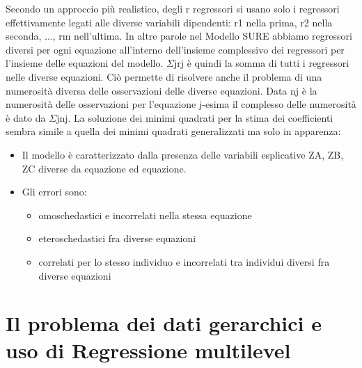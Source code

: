 \documentclass[a4page, 11pt]{article} %
\begin{document}
Secondo un approccio più realistico, degli r regressori si usano solo i regressori effettivamente legati alle diverse variabili dipendenti: r1 nella prima, r2 nella seconda, ..., rm nell’ultima.
\newline
In altre parole nel Modello SURE abbiamo regressori diversi per ogni equazione all’interno dell’insieme complessivo dei regressori per l’insieme delle equazioni del modello. 
\newline
$\Sigma$jrj è quindi la somma di tutti i regressori nelle diverse equazioni.
\newline
Ciò permette di risolvere anche il problema di una numerosità diversa delle osservazioni delle diverse equazioni. Data nj è la numerosità delle osservazioni per l’equazione j-esima il complesso delle numerosità è dato da $\Sigma$jnj.
\newline
La soluzione dei minimi quadrati per la stima dei coefficienti sembra simile a quella dei minimi quadrati generalizzati ma solo in apparenza: 
\begin{itemize}
\item Il modello è caratterizzato dalla presenza delle variabili esplicative ZA, ZB, ZC diverse da equazione ed equazione.
\item Gli errori sono:
	\begin{itemize}[noitemsep]
	\item omoschedastici e incorrelati nella stessa equazione
	\item eteroschedastici fra diverse equazioni
	\item correlati per lo stesso individuo e incorrelati tra individui diversi fra diverse equazioni
	\end{itemize}
\end{itemize}

\section{Il problema dei dati gerarchici e uso di Regressione multilevel}
\end{document}
